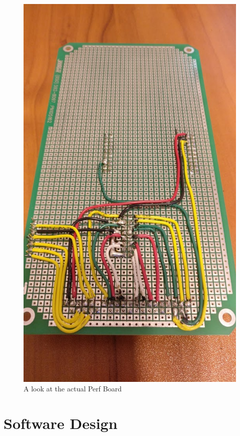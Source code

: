 \documentclass[a4paper, 12pt]{article}
\begin{document}
    \begin{figure}[H]
        \centering
        \includegraphics[scale=0.3]{pics/perfBoard}
        \caption{A look at the actual Perf Board}
        \label{fig:PerfSetup}
    \end{figure}

    \section{Software Design}
\end{document}
